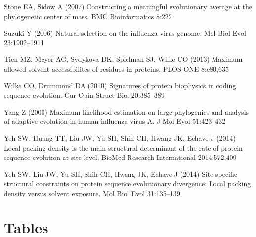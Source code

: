 \documentclass[smallextended]{svjour3}
\begin{document}
\begin{thebibliography}{59}
Stone EA, Sidow A (2007) Constructing a meaningful evolutionary average at the
  phylogenetic center of mass. BMC Bioinformatics 8:222

Suzuki Y (2006) Natural selection on the influenza virus genome. Mol Biol Evol
  23:1902--1911

Tien MZ, Meyer AG, Sydykova DK, Spielman SJ, Wilke CO (2013) Maximum allowed
  solvent accessibilites of residues in proteins. PLOS ONE 8:e80,635

Wilke CO, Drummond DA (2010) Signatures of protein biophysics in coding
  sequence evolution. Cur Opin Struct Biol 20:385--389

Yang Z (2000) Maximum likelihood estimation on large phylogenies and analysis
  of adaptive evolution in human influenza virus {A}. J Mol Evol 51:423--432

Yeh SW, Huang TT, Liu JW, Yu SH, Shih CH, Hwang JK, Echave J
  (2014{}) Local packing density is the main structural determinant
  of the rate of protein sequence evolution at site level. BioMed Research
  International 2014:572,409

Yeh SW, Liu JW, Yu SH, Shih CH, Hwang JK, Echave J (2014{})
  Site-specific structural constraints on protein sequence evolutionary
  divergence: Local packing density versus solvent exposure. Mol Biol Evol
  31:135--139

\end{thebibliography}

\newpage

\section*{Tables}
\end{document}

